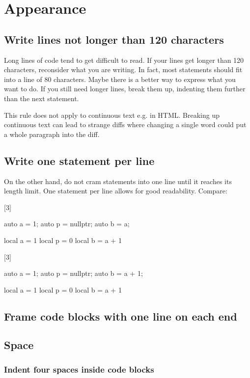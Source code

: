 \documentclass[a4paper,11pt]{scrreprt}
\newcommand{\marginMarker}[1]{%
\marginnote{%
    \hfill%
		\Huge{#1}%
}[3\baselineskip]%
}
\newcommand{\conforming}{%
\marginMarker{\textcolor{green}{\ding{51}}}%
}
\newcommand{\nonconforming}{%
\marginMarker{\textcolor{red}{\ding{55}}}%
}
\begin{document}
\chapter{Appearance}
\section{Write lines not longer than 120 characters}
Long lines of code tend to get difficult to read. If your lines get longer than 120 characters, reconsider what you are writing. In fact, most statements should fit into a line of 80 characters. Maybe there is a better way to express what you want to do. If you still need longer lines, break them up, indenting them further than the next statement.

This rule does not apply to continuous text e.g. in HTML. Breaking up continuous text can lead to strange diffs where changing a single word could put a whole paragraph into the diff.

\section{Write one statement per line}
On the other hand, do not cram statements into one line until it reaches its length limit. One statement per line allows for good readability. Compare:

\nonconforming{}
\begin{cppBox}
auto a = 1; auto p = nullptr; auto b = a;
\end{cppBox}
\begin{luaBox}
local a = 1 local p = 0 local b = a + 1
\end{luaBox}

\conforming{}
\begin{cppBox}
auto a = 1;
auto p = nullptr;
auto b = a + 1;
\end{cppBox}
\begin{luaBox}
local a = 1
local p = 0
local b = a + 1
\end{luaBox}

\section{Frame code blocks with one line on each end}
\section{Space}
\subsection{Indent four spaces inside code blocks}
\end{document}
